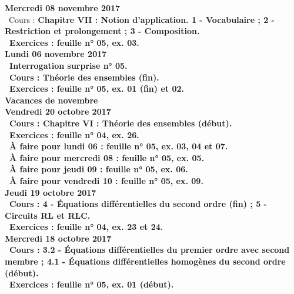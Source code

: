 \documentclass[12pt,a4paper]{article}
\begin{document}
\noindent\textbf{\bf Mercredi 08 novembre 2017}\\
\bu\ Cours : \bf Chapitre VII \rm : Notion d'application. 1 - Vocabulaire ; 2 - Restriction et prolongement ; 3 - 
Composition.\\
\bu\ Exercices : feuille n° 05, ex. 03.\vspace{.4cm}\\

\noindent\textbf{Lundi 06 novembre 2017}\\
\bu\ Interrogation surprise n° 05.\\
\bu\ Cours : Théorie des ensembles (fin).\\
\bu\ Exercices : feuille n° 05, ex. 01 (fin) et 02.\vspace{.4cm}\\

\noindent\textbf{ Vacances de novembre }\vspace{.4cm}\\

\noindent\textbf{Vendredi 20 octobre 2017}\\
\bu\ Cours : \bf Chapitre VI \rm : Théorie des ensembles (début).\\
\bu\ Exercices : feuille n° 04, ex. 26.\\
\bu\ À faire pour lundi 06 : feuille n° 05, ex. 03, 04 et 07.\\
\bu\ À faire pour mercredi 08 : feuille n° 05, ex. 05.\\
\bu\ À faire pour jeudi 09 : feuille n° 05, ex. 06.\\
\bu\ À faire pour vendredi 10 : feuille n° 05, ex. 09.\vspace{.4cm}\\

\noindent\textbf{Jeudi 19 octobre 2017}\\
\bu\ Cours : 4 - Équations différentielles du second ordre (fin) ; 5 - Circuits RL et RLC.\\
\bu\ Exercices : feuille n° 04, ex. 23 et 24.\vspace{.4cm}\\

\noindent\textbf{\bf Mercredi 18 octobre 2017}\\
\bu\ Cours : 3.2 - Équations différentielles du premier ordre avec second membre ; 4.1 - Équations 
différentielles homogènes du second ordre (début).\\
\bu\ Exercices : feuille n° 05, ex. 01 (début).\vspace{.4cm}\\
\end{document}
